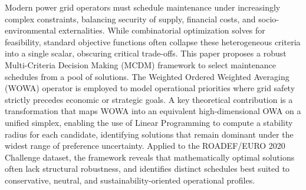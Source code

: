 Modern power grid operators must schedule maintenance under increasingly complex constraints, balancing security of supply, financial costs, and socio-environmental externalities. While combinatorial optimization solves for feasibility, standard objective functions often collapse these heterogeneous criteria into a single scalar, obscuring critical trade-offs. This paper proposes a robust Multi-Criteria Decision Making (MCDM) framework to select maintenance schedules from a pool of solutions. The Weighted Ordered Weighted Averaging (WOWA) operator is employed to model operational priorities where grid safety strictly precedes economic or strategic goals. A key theoretical contribution is a transformation that maps WOWA into an equivalent high-dimensional OWA on a unified simplex, enabling the use of Linear Programming to compute a stability radius for each candidate, identifying solutions that remain dominant under the widest range of preference uncertainty. Applied to the ROADEF/EURO 2020 Challenge dataset, the framework reveals that mathematically optimal solutions often lack structural robustness, and identifies distinct schedules best suited to conservative, neutral, and sustainability-oriented operational profiles.
